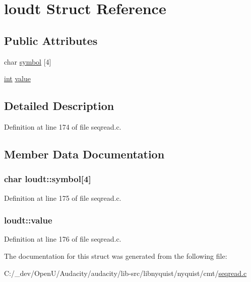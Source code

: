 \hypertarget{structloudt}{}\section{loudt Struct Reference}
\label{structloudt}
\subsection*{Public Attributes}
\begin{DoxyCompactItemize}
\item 
char \hyperlink{structloudt_aca10866fcca0fee8b11b010b31cedce9}{symbol} \mbox{[}4\mbox{]}
\item 
\hyperlink{xmltok_8h_a5a0d4a5641ce434f1d23533f2b2e6653}{int} \hyperlink{structloudt_a981b7eb3b45008724655b92236ebb262}{value}
\end{DoxyCompactItemize}


\subsection{Detailed Description}


Definition at line 174 of file seqread.\+c.



\subsection{Member Data Documentation}
\subsubsection[{\texorpdfstring{symbol}{symbol}}]{\setlength{\rightskip}{0pt plus 5cm}char loudt\+::symbol\mbox{[}4\mbox{]}}\hypertarget{structloudt_aca10866fcca0fee8b11b010b31cedce9}{}\label{structloudt_aca10866fcca0fee8b11b010b31cedce9}


Definition at line 175 of file seqread.\+c.

\subsubsection[{\texorpdfstring{value}{value}}]{ loudt\+::value}\hypertarget{structloudt_a981b7eb3b45008724655b92236ebb262}{}\label{structloudt_a981b7eb3b45008724655b92236ebb262}


Definition at line 176 of file seqread.\+c.



The documentation for this struct was generated from the following file\+:\begin{DoxyCompactItemize}
\item 
C\+:/\+\_\+dev/\+Open\+U/\+Audacity/audacity/lib-\/src/libnyquist/nyquist/cmt/\hyperlink{seqread_8c}{seqread.\+c}\end{DoxyCompactItemize}
